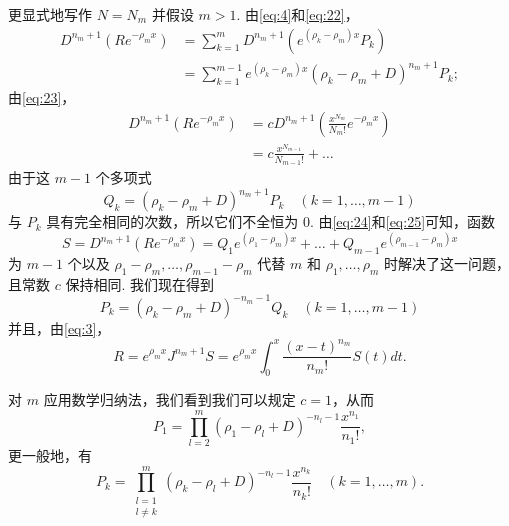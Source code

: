 更显式地写作 $N=N_m$ 并假设 $m > 1$. 由\eqref{eq:4}和\eqref{eq:22}，
\begin{equation} \begin{aligned} D^{n_m+1}(Re^{-\rho_m x}) &= \sum_{k=1}^{m} D^{n_m+1}(e^{(\rho_k-\rho_m)x}P_k) \\ &= \sum_{k=1}^{m-1} e^{(\rho_k-\rho_m)x}(\rho_k-\rho_m+D)^{n_m+1}P_k; \end{aligned} \tag{24}\label{eq:24} \end{equation}
由\eqref{eq:23}，
\begin{equation} \begin{aligned} D^{n_m+1}(Re^{-\rho_m x}) &= c D^{n_m+1}\left(\frac{x^{N_m}}{N_m!}e^{-\rho_m x}\right) \\ &= c\frac{x^{N_{m-1}}}{N_{m-1}!} + \dots \end{aligned} \tag{25}\label{eq:25} \end{equation}
由于这 $m-1$ 个多项式
\[ Q_k = (\rho_k - \rho_m + D)^{n_m+1} P_k \quad (k=1,\dots,m-1) \]
与 $P_k$ 具有完全相同的次数，所以它们不全恒为 0. 由\eqref{eq:24}和\eqref{eq:25}可知，函数
\[ S = D^{n_m+1} (Re^{-\rho_m x}) = Q_1 e^{(\rho_1-\rho_m)x} + \dots + Q_{m-1} e^{(\rho_{m-1}-\rho_m)x} \]
为 $m-1$ 个以及 $\rho_1 - \rho_m, \ldots, \rho_{m-1} - \rho_m$ 代替 $m$ 和 $\rho_1, \ldots, \rho_m$ 时解决了这一问题，且常数 $c$ 保持相同. 我们现在得到
\[ P_k = (\rho_k - \rho_m + D)^{-n_m-1} Q_k \quad (k=1,\dots,m-1) \]
并且，由\eqref{eq:3}，
\begin{equation} R = e^{\rho_m x} J^{n_m+1} S = e^{\rho_m x} \int_0^x \frac{(x-t)^{n_m}}{n_m!} S(t) dt. \tag{26}\label{eq:26} \end{equation}

对 $m$ 应用数学归纳法，我们看到我们可以规定 $c=1$，从而
\[ P_1 = \prod_{l=2}^{m} \left( \rho_1 - \rho_l + D \right)^{-n_l-1} \frac{x^{n_1}}{n_1!}, \]
更一般地，有
\begin{equation} P_k = \prod_{\substack{l=1\\l \neq k}}^{m} (\rho_k - \rho_l + D)^{-n_l-1} \frac{x^{n_k}}{n_k!} \quad (k=1,\dots,m). \tag{27}\label{eq:27} \end{equation}

